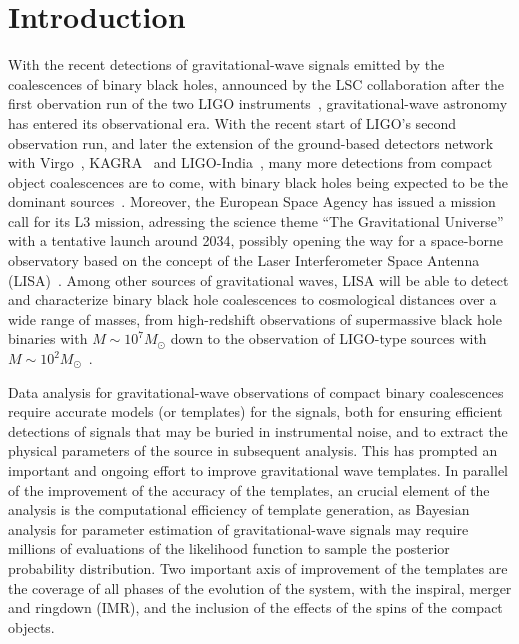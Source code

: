 \documentclass[aps,showpacs,%
prd,superscriptaddress,nofootinbib]{revtex4}
\newcommand{\Msol}{M_{\odot}}
\begin{document}

\section{Introduction}
\label{sec:intro}

With the recent detections of gravitational-wave signals emitted by the coalescences of binary black holes, announced by the LSC collaboration after the first obervation run of the two LIGO instruments~\cite{LIGO-theevent-2016,LIGO-christmasevent-2016,LIGO-O1BBH-2016}, gravitational-wave astronomy has entered its observational era. With the recent start of LIGO's second observation run, and later the extension of the ground-based detectors network with Virgo~\cite{Virgo}, KAGRA~\cite{KAGRA} and LIGO-India~\cite{INDIGO}, many more detections from compact object coalescences are to come, with binary black holes being expected to be the dominant sources~\cite{}. Moreover, the European Space Agency has issued a mission call for its L3 mission, adressing the science theme ``The Gravitational Universe'' with a tentative launch around 2034, possibly opening the way for a space-borne observatory based on the concept of the Laser Interferometer Space Antenna (LISA)~\cite{LISA09}. Among other sources of gravitational waves, LISA will be able to detect and characterize binary black hole coalescences to cosmological distances over a wide range of masses, from high-redshift observations of supermassive black hole binaries with $M\sim 10^{7} \Msol$ down to the observation of LIGO-type sources with $M\sim 10^{2} \Msol$~\cite{Sesana16}.

Data analysis for gravitational-wave observations of compact binary coalescences require accurate models (or templates) for the signals, both for ensuring efficient detections of signals that may be buried in instrumental noise, and to extract the physical parameters of the source in subsequent analysis. This has prompted an important and ongoing effort to improve gravitational wave templates. In parallel of the improvement of the accuracy of the templates, an crucial element of the analysis is the computational efficiency of template generation, as Bayesian analysis for parameter estimation of gravitational-wave signals may require millions of evaluations of the likelihood function to sample the posterior probability distribution. Two important axis of improvement of the templates are the coverage of all phases of the evolution of the system, with the inspiral, merger and ringdown (IMR), and the inclusion of the effects of the spins of the compact objects.
\end{document}

